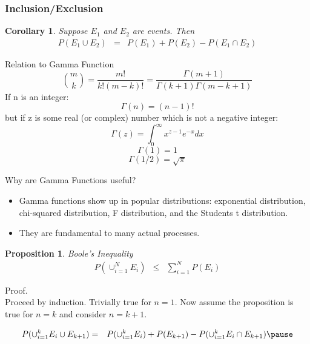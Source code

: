 \documentclass{beamer}
\newtheorem{prop}{Proposition}
\newtheorem{cor}{Corollary}
\numberwithin{equation}{section}
\begin{document}
\begin{frame}
\frametitle{Inclusion/Exclusion}


\begin{cor}
Suppose $E_{1}$ and $E_{2} $ are events.  Then 
\begin{eqnarray}
P(E_{1} \cup E_{2} ) & = & P(E_{1} ) + P(E_{2} ) - P(E_{1} \cap E_{2} ) \nonumber 
\end{eqnarray}
\end{cor}


\end{frame}


\begin{frame}{Relation to Gamma Function}
$${{m}\choose{k}}=\frac{m!}{k!(m-k)!}=\frac{\Gamma(m+1)}{\Gamma(k+1)\Gamma(m-k+1)}$$\pause
If n is an integer:
$$\Gamma(n)=(n-1)!$$\pause
but if z is some real (or complex) number which is not a negative integer: \pause
$$\Gamma(z)=\int_0^\infty x^{z-1}e^{-x}dx$$\pause
$$\Gamma(1)=1$$\pause
$$\Gamma(1/2)=\sqrt{\pi}$$

\end{frame}

\begin{frame}{Why are Gamma Functions useful?}
\begin{itemize}
\item Gamma functions show up in popular distributions: exponential distribution, chi-squared distribution, F distribution, and the Students t distribution.
\item They are fundamental to many actual processes.
\end{itemize}

\end{frame}



\begin{frame}

\begin{prop}
\alert{Boole's Inequality}
\begin{eqnarray}
P(\cup_{i=1}^{N} E_{i}) & \leq & \sum_{i=1}^{N} P(E_{i} ) \nonumber 
\end{eqnarray}

\end{prop}
\pause 
Proof. \pause \\
Proceed by induction.  Trivially true for $n =1 $.  Now assume the proposition is true for $n = k$ and consider $n = k + 1$.   \pause 

\begin{eqnarray}
P(\cup_{i=1}^{k} E_i \cup E_{k + 1} )  & = & P(\cup_{i=1}^{k} E_i) + P(E_{k + 1} ) - P(\cup_{i=1}^{k} E_i \cap E_{k + 1})\nonumber  \pause 
\end{eqnarray}



\end{frame}
\end{document}
